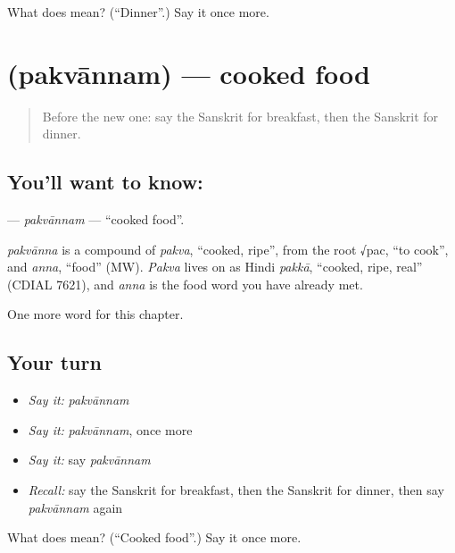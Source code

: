 \begin{tcolorbox}[breakable,colback=teal!4,colframe=teal!35!black,title={Before you move on}]
What does  mean? (\textquotedblleft{}Dinner\textquotedblright{}.) Say it once more.
\end{tcolorbox}
\section[\texorpdfstring{\sk{पक्वान्नम्} (pakvānnam)}{पक्वान्नम् (pakvānnam)}]{ (pakvānnam) — cooked food}

\label{lesson:SA-C254-pakvannam}



\begin{quote}
Before the new one: say the Sanskrit for breakfast, then the Sanskrit for dinner.
\end{quote}

\subsection*{You'll want to know: }
\textbf{} — \emph{pakvānnam} — \textquotedblleft{}cooked food\textquotedblright{}.

\begin{cousinweb}
\emph{pakvānna} is a compound of \emph{pakva}, \textquotedblleft{}cooked, ripe\textquotedblright{}, from the root √pac, \textquotedblleft{}to cook\textquotedblright{}, and \emph{anna}, \textquotedblleft{}food\textquotedblright{} (MW). \emph{Pakva} lives on as Hindi \emph{pakkā}, \textquotedblleft{}cooked, ripe, real\textquotedblright{} (CDIAL 7621), and \emph{anna} is the food word you have already met.
\end{cousinweb}

\begin{grammarlens}[title={What you've built}]
One more word for this chapter.
\end{grammarlens}

\subsection*{Your turn}
\begin{itemize}
\raggedright
  \item \emph{Say it:} \emph{pakvānnam}
  \item \emph{Say it:} \emph{pakvānnam}, once more
  \item \emph{Say it:} say \emph{pakvānnam}
  \item \emph{Recall:} say the Sanskrit for breakfast, then the Sanskrit for dinner, then say \emph{pakvānnam} again
\end{itemize}

\begin{tcolorbox}[breakable,colback=teal!4,colframe=teal!35!black,title={Before you move on}]
What does  mean? (\textquotedblleft{}Cooked food\textquotedblright{}.) Say it once more.
\end{tcolorbox}

